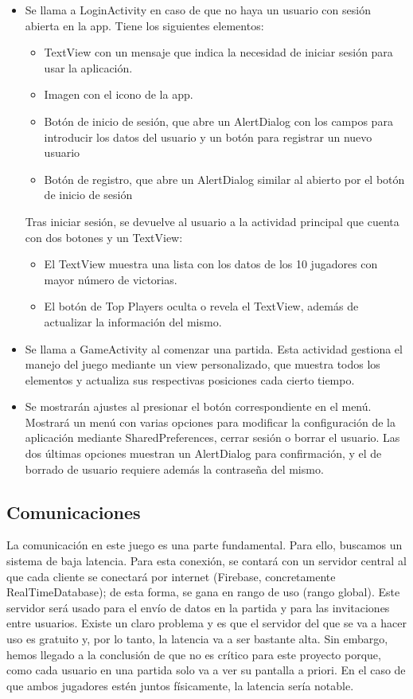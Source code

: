 \documentclass[a4paper,openright,12pt]{article}
\begin{document}
\begin{itemize}
    \item Se llama a LoginActivity en caso de que no haya un usuario con sesión abierta en la app. Tiene los siguientes elementos:
    \begin{itemize}
        \item TextView con un mensaje que indica la necesidad de iniciar sesión para usar la aplicación.
	\item Imagen con el icono de la app.
        \item Botón de inicio de sesión, que abre un AlertDialog con los campos para introducir los datos del usuario y un botón para registrar un nuevo usuario
        \item Botón de registro, que abre un AlertDialog similar al abierto por el botón de inicio de sesión
    \end{itemize}
    Tras iniciar sesión, se devuelve al usuario a la actividad principal que cuenta con dos botones y un TextView:
    \begin{itemize}
       \item El TextView muestra una lista con los datos de los 10 jugadores con mayor número de victorias. 
        
        \item El botón de Top Players oculta o revela el TextView, además de actualizar la información del mismo.
    \end{itemize}

    \item Se llama a GameActivity al comenzar una partida. Esta actividad gestiona el manejo del juego mediante un view personalizado, que muestra todos los elementos y actualiza sus respectivas posiciones cada cierto tiempo.

    \item Se mostrarán ajustes al presionar el botón correspondiente en el menú. Mostrará un menú con varias opciones para modificar la configuración de la aplicación mediante SharedPreferences, cerrar sesión o borrar el usuario. Las dos últimas opciones muestran un AlertDialog para confirmación, y el de borrado de usuario requiere además la contraseña del mismo.
\end{itemize}


\subsection{Comunicaciones}
La comunicación en este juego es una parte fundamental. Para ello, buscamos un sistema de baja latencia. Para esta conexión, se contará con un servidor central al que cada cliente se conectará por internet (Firebase, concretamente RealTimeDatabase); de esta forma, se gana en rango de uso (rango global). Este servidor será usado para el envío de datos en la partida y para las invitaciones entre usuarios. Existe un claro problema y es que el servidor del que se va a hacer uso es gratuito y, por lo tanto, la latencia va a ser bastante alta. Sin embargo, hemos llegado a la conclusión de que no es crítico para este proyecto porque, como cada usuario en una partida solo va a ver su pantalla a priori. En el caso de que ambos jugadores estén juntos físicamente, la latencia sería notable.
\end{document}
